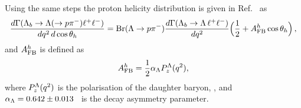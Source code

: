 Using the same steps the proton helicity distribution is given in Ref.~\cite{Gutsche:2013pp} as
\begin{equation}
\frac{d\Gamma(\Lambda_{b}\to \Lambda(\to p \pi^{-})\ell^{+}\ell^{-})}
     {dq^2\,d\cos\theta_h} 
={\rm Br}(\Lambda \to p\pi^{-})
 \frac{d\Gamma(\Lambda_b \to \Lambda\, \ell^{+}\ell^{-})}{d q^2}
\Big(\frac{1}{2}+\afbh\cos\theta_h\Big) \,,
\label{eq:afbBTh}
\end{equation}
and $A_{\rm FB}^h$ is defined as
\begin{equation}
A_{\rm FB}^h=\frac{1}{2}\alpha_{\Lambda}P_z^\Lambda(q^2),
\end{equation} 
where $P_z^\Lambda(q^2)$ is the polarisation of the daughter baryon, \Lz,
and $\alpha_{\Lambda} = 0.642 \pm 0.013$~\cite{PDG2014} is the \Lz decay asymmetry parameter.



